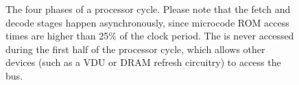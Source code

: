 \begin{figure}
\centering
{}
\caption[Phases of a processor cycle]{\label{fig:processor-cycle} The four phases of a processor cycle. Please note that the fetch and decode stages happen asynchronously, since microcode ROM access times are higher than 25\% of the clock period. The \DBUS{} is never accessed during the first half of the processor cycle, which allows other devices (such as a VDU or DRAM refresh circuitry) to access the bus.}
\end{figure}










